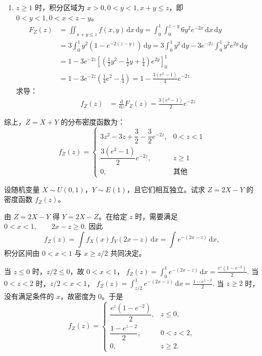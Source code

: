 \documentclass[lang=cn,11pt]{elegantbook}
\begin{document}
\begin{solution}
\begin{enumerate}
    \item $z \geqslant 1$ 时，积分区域为 $x>0, 0<y<1, x+y \leqslant z$，即 $0 < y < 1, 0 < x < z-y$。
\begin{align*}
    F_Z(z) &= \iint_{x+y\leqslant z} f(x,y) \,\mathrm{d}x\,\mathrm{d}y = \int_0^1 \int_0^{z-y} 6y^2 e^{-2x} \,\mathrm{d}x\,\mathrm{d}y \\
    &= 3 \int_0^1 y^2 \left( 1 - e^{-2(z-y)} \right) \,\mathrm{d}y = 3 \int_0^1 y^2 \,\mathrm{d}y - 3e^{-2z} \int_0^1 y^2 e^{2y} \,\mathrm{d}y \\
    &= 1 - 3e^{-2z} \left[ \left( \frac{1}{2}y^2 - \frac{1}{2}y + \frac{1}{4} \right) e^{2y} \right]_0^1 \\
    &= 1 - 3e^{-2z} \left( \frac{1}{4}e^2 - \frac{1}{4} \right) = 1 - \frac{3(e^2-1)}{4}e^{-2z}
\end{align*}
求导：
\begin{align*}
    f_Z(z) &= \frac{\mathrm{d}}{\mathrm{d}z} F_Z(z) = \frac{3(e^2-1)}{2}e^{-2z}
\end{align*}
\end{enumerate}
综上，$Z = X + Y$ 的分布密度函数为：
\[
f_Z(z) = \begin{cases} 3z^2 - 3z + \dfrac{3}{2} - \dfrac{3}{2}e^{-2z}, & 0 < z < 1 \\ \dfrac{3(e^2-1)}{2}e^{-2z}, & z \geqslant 1 \\ 0, & \text{其他} \end{cases}
\]
\end{solution}

\begin{exercise}\label{exer:src-paper1-app-03}\label{prob:p1-app-03}
设随机变量 \(X\sim U(0,1)\)，\(Y\sim E(1)\)，且它们相互独立。试求
\(
Z=2X-Y
\)
的密度函数 \(f_Z(z)\)。
\end{exercise}
\begin{solution}
由 \(Z=2X-Y\) 得 \(Y=2X-Z\)。在给定 \(z\) 时，需要满足
\(
0<x<1,\qquad 2x-z\ge0.
\)
因此
\[
f_Z(z)=\int f_X(x)f_Y(2x-z)\,\mathrm dx
=\int e^{-(2x-z)}\,\mathrm dx,
\]
积分区间由 \(0<x<1\) 与 \(x\ge z/2\) 共同决定。

当 \(z\le0\) 时，\(z/2\le0\)，故 \(0<x<1\)，
\(
f_Z(z)=\int_0^1 e^{-(2x-z)}\,\mathrm dx
=\frac{e^z(1-e^{-2})}{2}.
\)
当 \(0<z<2\) 时，\(z/2<x<1\)，
\(
f_Z(z)=\int_{z/2}^{1} e^{-(2x-z)}\,\mathrm dx
=\frac{1-e^{z-2}}{2}.
\)
当 \(z\ge2\) 时，没有满足条件的 \(x\)，故密度为 \(0\)。于是
\[
f_Z(z)=
\begin{cases}
\dfrac{e^z(1-e^{-2})}{2}, & z\le0,\\
\dfrac{1-e^{z-2}}{2}, & 0<z<2,\\
0, & z\ge2.
\end{cases}
\]
\end{solution}
\end{document}
